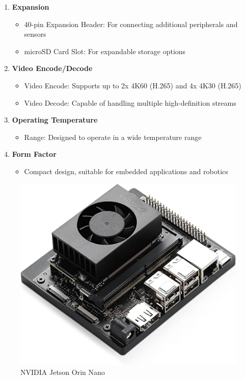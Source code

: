 {\begin{enumerate}
		\item \textbf{Expansion}
		\begin{itemize}
			\item 40-pin Expansion Header: For connecting additional peripherals and sensors
			\item microSD Card Slot: For expandable storage options
		\end{itemize}
		
		\item \textbf{Video Encode/Decode}
		\begin{itemize}
			\item Video Encode: Supports up to 2x 4K60 (H.265) and 4x 4K30 (H.265)
			\item Video Decode: Capable of handling multiple high-definition streams
		\end{itemize}
		
		\item \textbf{Operating Temperature}
		\begin{itemize}
			\item Range: Designed to operate in a wide temperature range
		\end{itemize}
		
		\item \textbf{Form Factor}
		\begin{itemize}
			\item Compact design, suitable for embedded applications and robotics
		\end{itemize}
	\end{enumerate}
	
	\begin{figure}[H]
		\centering
		\includegraphics[scale=0.24]{images/Content/jetson_orin_nano}
		\caption{NVIDIA Jetson Orin Nano}
		\label{fig:jetson}
	\end{figure}
}

